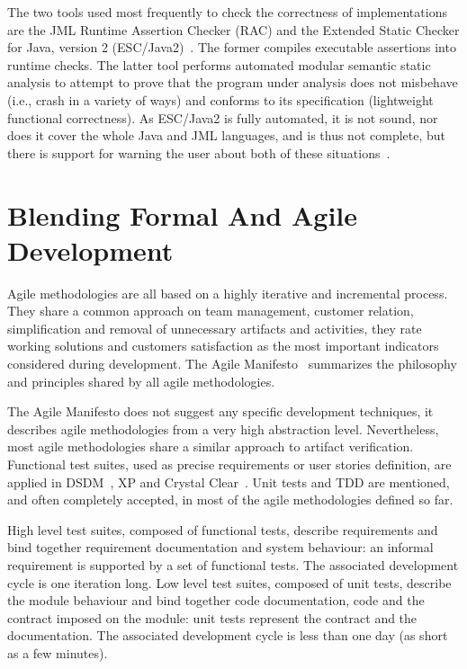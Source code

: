\documentclass[english]{lni}
\begin{document}
The two tools used most frequently to check the correctness of implementations are the JML Runtime Assertion Checker (RAC) and the
Extended Static Checker for Java, version 2 (ESC/Java2)~\cite{Cheon-Leavens02b,BurdyEtal05-STTT,KiniryCok04}.  
The former compiles executable assertions into runtime checks.  
The latter tool performs automated modular semantic static analysis to attempt to prove that the program under analysis does not misbehave (i.e., crash in a variety of ways) and conforms to its specification (lightweight functional correctness).  
As ESC/Java2 is fully automated, it is not sound, nor does it cover the whole Java and JML languages, and is thus not complete, but there is support for warning the user about both of these situations~\cite{KiniryEtal06}.



\section{Blending Formal And Agile Development}
\label{sec:blending_formal_and_agile_development}

Agile methodologies are all based on a highly iterative and incremental process.
They share a common approach on team management, customer relation, simplification and removal of unnecessary artifacts and activities, they rate working solutions and customers satisfaction as the most important indicators considered during development.
The Agile Manifesto~\cite{Beck2001} summarizes the philosophy and principles shared by all agile methodologies.

The Agile Manifesto does not suggest any specific development techniques, it describes agile methodologies from a very high abstraction level.
Nevertheless, most agile methodologies share a similar approach to artifact verification.
Functional test suites, used as precise requirements or user stories definition, are applied in DSDM~\cite{Stapleton1997}, XP and Crystal Clear~\cite{Cockburn2004}. 
Unit tests and TDD are mentioned, and often completely accepted, in most of the agile methodologies defined so far.

High level test suites, composed of functional tests, describe requirements and bind together requirement documentation and system behaviour: an informal requirement is supported by a set of functional tests. 
The associated development cycle is one iteration long. 
Low level test suites, composed of unit tests, describe the module behaviour and bind together code documentation, code and the contract imposed on the module: unit tests represent the contract and the documentation. 
The associated development cycle is less than one day (as short as a few minutes).
\end{document}
